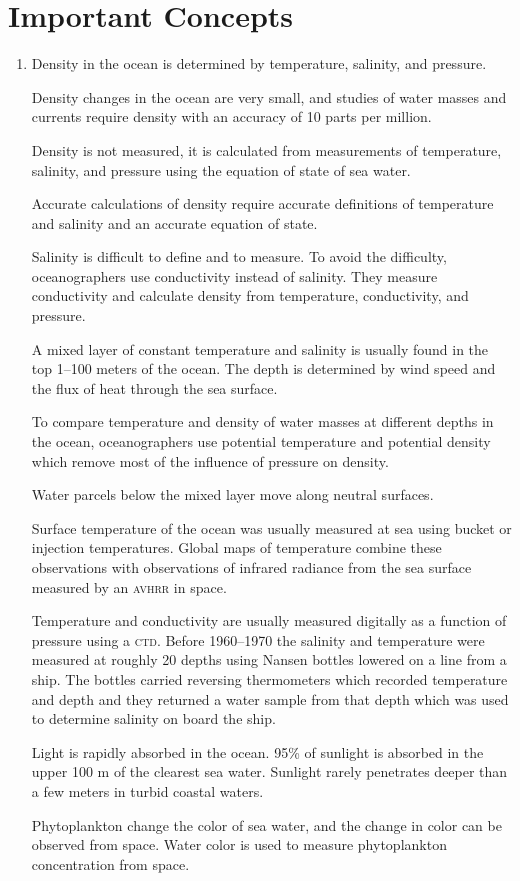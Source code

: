 \section{Important Concepts}
\begin{enumerate}
\item Density in the ocean is determined by temperature, salinity, and pressure.

\vitem Density changes in the ocean are very small, and studies of water masses
and currents require density with an accuracy of 10 parts per million.

\vitem Density is not measured, it is calculated from measurements of
temperature, salinity, and pressure using the equation of state of sea water.

\vitem Accurate calculations of density require accurate definitions of
temperature and salinity and an accurate equation of state.

\vitem Salinity is difficult to define and to measure. To avoid the difficulty,
oceanographers use conductivity instead of salinity. They measure conductivity
and calculate density from temperature, conductivity, and pressure.

\vitem A mixed layer of constant temperature and salinity is usually found
in the top 1--100 meters of the ocean. The depth is determined by wind speed and
the flux of heat through the sea surface.

\vitem To compare temperature and density of water masses at different depths in
the ocean, oceanographers use potential temperature and potential density which
remove most of the influence of pressure on density.

\vitem Water parcels below the mixed layer move along neutral surfaces.

\vitem Surface temperature of the ocean was usually measured at sea using bucket
or injection temperatures. Global maps of temperature combine these observations
with observations of infrared radiance from the sea surface measured by an
\textsc{avhrr} in space.

\vitem Temperature and conductivity are usually measured digitally as a function
of pressure using a \textsc{ctd}. Before 1960--1970 the salinity and temperature
were measured at roughly 20 depths using Nansen bottles lowered on a line from a
ship. The bottles carried reversing thermometers which recorded
temperature and depth and they returned a water sample from that depth which was used to
determine salinity on board the ship.

\vitem Light is rapidly absorbed in the ocean. 95\% of sunlight is absorbed in
the upper 100 m of the clearest sea water. Sunlight rarely penetrates deeper
than a few meters in turbid coastal waters.

\vitem Phytoplankton change the color of sea water, and the change in color can
be observed from space. Water color is used to measure phytoplankton
concentration from space.

\end{enumerate}


